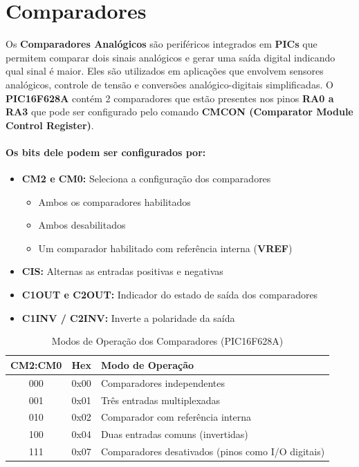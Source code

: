\documentclass[12pt,a4paper]{book}
\begin{document}
\section{Comparadores}
Os \textbf{Comparadores Analógicos} são periféricos integrados em \textbf{PICs} que permitem comparar dois sinais analógicos e gerar uma saída digital indicando qual sinal é maior. Eles são utilizados em aplicações que envolvem sensores analógicos, controle de tensão e conversões analógico-digitais simplificadas. O \textbf{PIC16F628A} contém 2 comparadores que estão presentes nos pinos \textbf{RA0 a RA3} que pode ser configurado pelo comando \textbf{CMCON (Comparator Module Control Register)}.
\paragraph{Os bits dele podem ser configurados por:}
\begin{itemize}
    \item \textbf{CM2 e CM0:} Seleciona a configuração dos comparadores
    \begin{itemize}
        \item Ambos os comparadores habilitados
        \item Ambos desabilitados
        \item Um comparador habilitado com referência interna (\textbf{VREF})
    \end{itemize}
    
    \item \textbf{CIS:} Alternas as entradas positivas e negativas
    \item \textbf{C1OUT e C2OUT:} Indicador do estado de saída dos comparadores
    \item \textbf{C1INV / C2INV:} Inverte a polaridade da saída
\end{itemize}
\begin{table}[h]
\centering
\begin{tabular}{|c|c|l|}
\hline
\textbf{CM2:CM0} & \textbf{Hex} & \textbf{Modo de Operação} \\
\hline
000 & 0x00 & Comparadores independentes \\
\hline
001 & 0x01 & Três entradas multiplexadas \\
\hline
010 & 0x02 & Comparador com referência interna \\
\hline
100 & 0x04 & Duas entradas comuns (invertidas) \\
\hline
111 & 0x07 & Comparadores desativados (pinos como I/O digitais) \\
\hline
\end{tabular}
\caption{Modos de Operação dos Comparadores (PIC16F628A)}
\label{tab:cmcon_simple}
\end{table}
\end{document}
